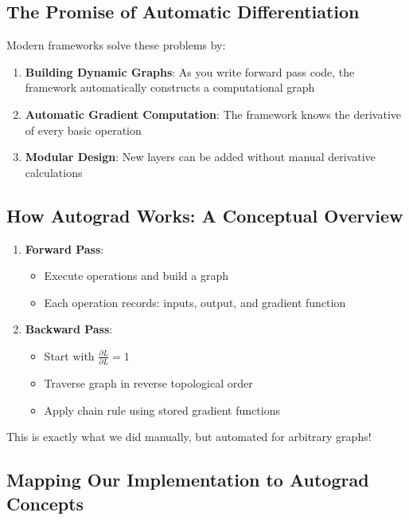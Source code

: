 \documentclass{article}
\begin{document}
\subsection{The Promise of Automatic Differentiation}

Modern frameworks solve these problems by:
\begin{enumerate}
    \item \textbf{Building Dynamic Graphs}: As you write forward pass code, the framework automatically constructs a computational graph
    \item \textbf{Automatic Gradient Computation}: The framework knows the derivative of every basic operation
    \item \textbf{Modular Design}: New layers can be added without manual derivative calculations
\end{enumerate}

\subsection{How Autograd Works: A Conceptual Overview}

\begin{tcolorbox}[colback=blue!5!white, colframe=blue!50!black, title=The Autograd Algorithm]
\begin{enumerate}
    \item \textbf{Forward Pass}: 
    \begin{itemize}
        \item Execute operations and build a graph
        \item Each operation records: inputs, output, and gradient function
    \end{itemize}
    \item \textbf{Backward Pass}:
    \begin{itemize}
        \item Start with $\frac{\partial L}{\partial L} = 1$
        \item Traverse graph in reverse topological order
        \item Apply chain rule using stored gradient functions
    \end{itemize}
\end{enumerate}
\end{tcolorbox}

This is exactly what we did manually, but automated for arbitrary graphs!




\subsection{Mapping Our Implementation to Autograd Concepts}
\end{document}
